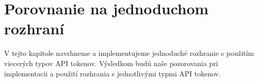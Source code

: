 \chapter{Porovnanie na jednoduchom rozhraní}

\label{kap:rozhranie} %

V tejto kapitole navrhneme a implementujeme jednoduché rozhranie s použitím viecerých typov API tokenov. Výsledkom budú naše pozorovania pri implementacii a použití rozhrania s jednotlivými typmi API tokenov.